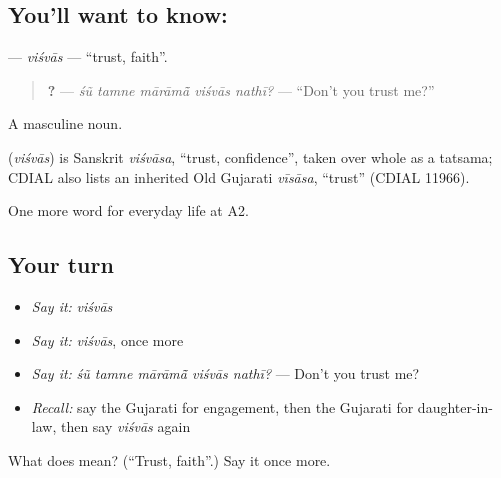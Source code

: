 \subsection*{You'll want to know: }
\textbf{} — \emph{viśvās} — \textquotedblleft{}trust, faith\textquotedblright{}.

\begin{quote}
\textbf{    ?} — \emph{śũ tamne mārāmā̃ viśvās nathī?} — \textquotedblleft{}Don't you trust me?\textquotedblright{}
\end{quote}

A masculine noun.

\begin{cousinweb}
\textbf{} (\emph{viśvās}) is Sanskrit \emph{viśvāsa}, \textquotedblleft{}trust, confidence\textquotedblright{}, taken over whole as a tatsama; CDIAL also lists an inherited Old Gujarati \emph{vīsāsa}, \textquotedblleft{}trust\textquotedblright{} (CDIAL 11966).
\end{cousinweb}

\begin{grammarlens}[title={What you've built}]
One more word for everyday life at A2.
\end{grammarlens}

\subsection*{Your turn}
\begin{itemize}
\raggedright
  \item \emph{Say it:} \emph{viśvās}
  \item \emph{Say it:} \emph{viśvās}, once more
  \item \emph{Say it:} \emph{śũ tamne mārāmā̃ viśvās nathī?} — Don't you trust me?
  \item \emph{Recall:} say the Gujarati for engagement, then the Gujarati for daughter-in-law, then say \emph{viśvās} again
\end{itemize}

\begin{tcolorbox}[breakable,colback=teal!4,colframe=teal!35!black,title={Before you move on}]
What does  mean? (\textquotedblleft{}Trust, faith\textquotedblright{}.) Say it once more.
\end{tcolorbox}

